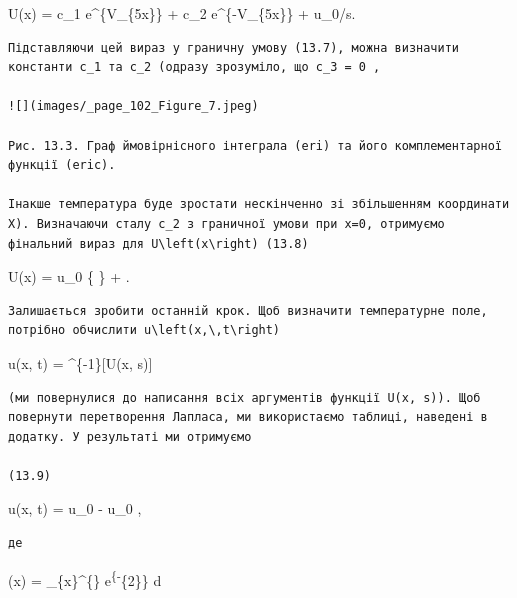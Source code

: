 \documentclass[
  ukrainian,
]{article}
\begin{document}
U(x) = c\_1 e\^{}\{V\_\{5x\}\} + c\_2 e\^{}\{-V\_\{5x\}\} + u\_0/s.

\begin{verbatim}
Підставляючи цей вираз у граничну умову (13.7), можна визначити константи c_1 та c_2 (одразу зрозуміло, що c_3 = 0 ,

![](images/_page_102_Figure_7.jpeg)

Рис. 13.3. Граф ймовірнісного інтеграла (eri) та його комплементарної функції (eric).

Інакше температура буде зростати нескінченно зі збільшенням координати X). Визначаючи сталу c_2 з граничної умови при x=0, отримуємо фінальний вираз для U\left(x\right) (13.8)
\end{verbatim}

U(x) = u\_0 \left\{ 
\right\} + .

\begin{verbatim}
Залишається зробити останній крок. Щоб визначити температурне поле, потрібно обчислити u\left(x,\,t\right)
\end{verbatim}

u(x, t) = \^{}\{-1\}{[}U(x, s){]}

\begin{verbatim}
(ми повернулися до написання всіх аргументів функції U(x, s)). Щоб повернути перетворення Лапласа, ми використаємо таблиці, наведені в додатку. У результаті ми отримуємо

(13.9)
\end{verbatim}

u(x, t) = u\_0 - u\_0
,

\begin{verbatim}
де
\end{verbatim}

(x) =  \int\_\{x\}\^{}\{\infty\}
e\textsuperscript{\{-\xi}\{2\}\} d\xi
\end{document}
